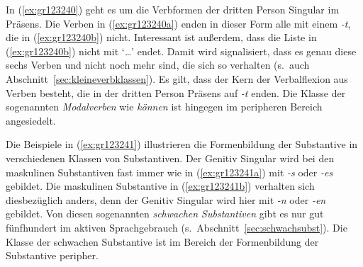 
In (\ref{ex:gr123240}) geht es um die Verbformen der dritten Person Singular im Präsens.
Die Verben in (\ref{ex:gr123240a}) enden in dieser Form alle mit einem \textit{-t}, die in (\ref{ex:gr123240b}) nicht.
Interessant ist außerdem, dass die Liste in (\ref{ex:gr123240b}) nicht mit `\textit{\ldots}' endet.
Damit wird signalisiert, dass es genau diese sechs Verben und nicht noch mehr sind, die sich so verhalten (s.\ auch Abschnitt~\ref{sec:kleineverbklassen}).
Es gilt, dass der Kern der Verbalflexion aus Verben besteht, die in der dritten Person Präsens auf \textit{-t} enden.
Die Klasse der sogenannten \textit{Modalverben} wie \textit{können} ist hingegen im peripheren Bereich angesiedelt.


Die Beispiele in (\ref{ex:gr123241}) illustrieren die Formenbildung der Substantive in verschiedenen Klassen von Substantiven.
Der Genitiv Singular wird bei den maskulinen Substantiven fast immer wie in (\ref{ex:gr123241a}) mit \textit{-s} oder \textit{-es} gebildet.
Die maskulinen Substantive in (\ref{ex:gr123241b}) verhalten sich diesbezüglich anders, denn der Genitiv Singular wird hier mit \textit{-n} oder \textit{-en} gebildet.
Von diesen sogenannten \textit{schwachen Substantiven} gibt es nur gut fünfhundert im aktiven Sprachgebrauch (s.\ Abschnitt~\ref{sec:schwachsubst}).
Die Klasse der schwachen Substantive ist im Bereich der Formenbildung der Substantive peripher.


